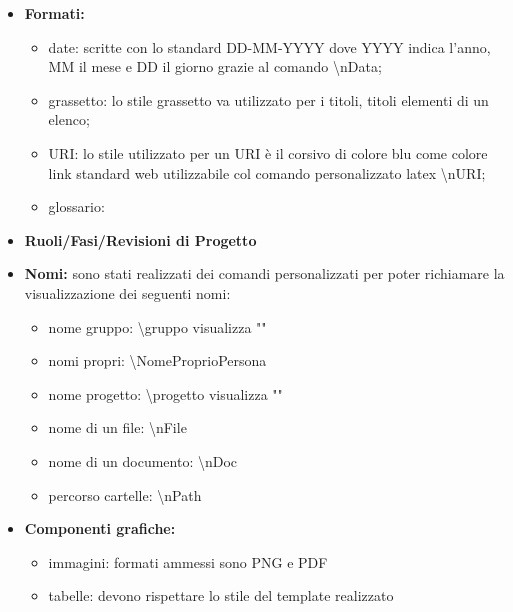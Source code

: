\documentclass[NormeDiProgetto.tex]{subfiles}
\begin{document}
\begin{itemize}
			\item \textbf{Formati:}
			\begin{itemize}
				\item date: scritte con lo standard DD-MM-YYYY dove YYYY indica l'anno, MM il mese e DD il giorno grazie al comando \textbackslash nData;
				\item grassetto: lo stile grassetto va utilizzato per i titoli, titoli elementi di un elenco; 
				\item URI: lo stile utilizzato per un URI è il corsivo di colore blu come colore link standard web utilizzabile col comando personalizzato latex \textbackslash nURI;
				
				\item glossario: %
			\end{itemize}
			
			\item \textbf{Ruoli/Fasi/Revisioni di Progetto} %
			
			\item \textbf{Nomi:} sono stati realizzati dei comandi personalizzati per poter richiamare la visualizzazione dei seguenti nomi:
			\begin{itemize}
				\item nome gruppo: \textbackslash gruppo visualizza "\gruppo"
				\item nomi propri: \textbackslash NomeProprioPersona 
				\item nome progetto: \textbackslash progetto visualizza "\progetto"
				\item nome di un file: \textbackslash nFile
				\item nome di un documento: \textbackslash nDoc
				\item percorso cartelle: \textbackslash nPath
			\end{itemize}
		
			\item \textbf{Componenti grafiche:}
			 \begin{itemize}
			 	\item immagini: formati ammessi sono PNG e PDF 
			 	\item tabelle: devono rispettare lo stile del template realizzato %
			 \end{itemize}
			
		\end{itemize}
	
\end{document}
